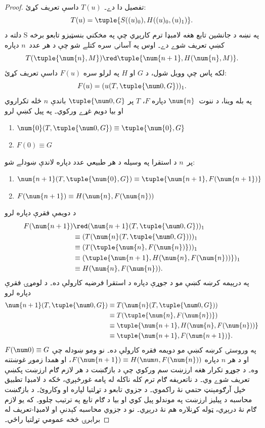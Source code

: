 \documentclass[../../../include/open-logic-section]{subfiles}
\begin{document}
\begin{proof}
تفصيل دا دے۔ $T(u)$ داسې تعريف کړئ:
\[
T(u) = \tuple{S((u)_0), H((u)_0,(u)_1)}.
\]
دلته د S په نښه د جانشين تابع هغه لامبډا
ترم کارېږي چې په مخکني بنسټيزو تابعو برخه کښې تعريف شوے دے۔
اوس په آسانۍ سره کتلے شو چې د هر عدد~$n$ دپاره
\[
T(\tuple{\num{n}, M}) \red \tuple{\num{n+1}, H(\num{n}, M)}.
\]
لکه پاس چې وويل شول، د $G$ او $H$ په لرلو سره $F(u)$ داسې
تعريف کړئ:
\[
F(u) = (u(T,\tuple{\num 0, G}))_1.
\]
په بله وينا، د ننوت~$\num{n}$ دپاره $F$، $T$ پر
$\tuple{\num 0, G}$ باندې $n$ ځله تکراروي او بيا دويم غړے
ورکوي۔ په پيل کښې لرو
\begin{enumerate}
\item $\num{0} (T, \tuple{\num 0, G}) \equiv \tuple{\num{0}, G}$
\item $F(\num{0}) \equiv G$
\end{enumerate}
پر~$n$ د استقرا په وسيله د هر طبيعي عدد دپاره لاندې ښودلے شو:
\begin{enumerate}
\item $\num{n+1}(T, \tuple{\num{0}, G}) \equiv \tuple{\num{n+1}, F(\num{n+1})}$
\item $F(\num{n+1}) \equiv H(\num{n}, F(\num{n}))$
\end{enumerate}
د دويمې فقرې دپاره لرو
\begin{align*}
F(\num{n+1}) & \red (\num{n+1}(T, \tuple{\num 0, G}))_1 \\
& \equiv (T(\num{n} (T, \tuple{\num 0, G})))_1 \\
& \equiv (T(\tuple{\num{n}, F(\num{n})}))_1 \\
& \equiv (\tuple{\num{n+1}, H(\num{n}, F(\num{n}))})_1 \\
& \equiv H(\num{n}, F(\num{n})).
\end{align*}
په درېيمه کرښه کښې مو د جوړې دپاره د استقرا فرضيه کارولې ده۔
د لومړۍ فقرې دپاره لرو
\begin{align*}
\num{n+1} (T, \tuple{\num 0, G}) &
\equiv T(\num{n} (T, \tuple{\num 0, G})) \\
& \equiv T( \tuple{\num{n}, F(\num{n})}) \\
& \equiv \tuple{\num{n+1}, H(\num{n}, F(\num{n}))} \\
& \equiv \tuple{\num{n+1}, F(\num{n+1})}.
\end{align*}
په وروستۍ کرښه کښې مو دويمه فقره کارولې ده۔ نو ومو ښودله چې
$F(\num 0) \equiv G$ او د هر $n$ دپاره $F(\num {n+1}) \equiv H(\num
n, F(\num{n}))$، او همدا زموږ غوښتنه وه۔
د جوړو تکرار هغه ارزښت سم ورکوي چې د بازګښت د هر لازم ګام ارزښت پکښې تعريف شوے وي۔ د ناتعريفه ګام ترم کله ناکله له پامه غورځېږي، ځکه د لامبډا تطبيق خپل آرګومېنټ حتمي نۀ راکموي۔ د جزوي تابعو د تړلتيا لپاره  او  وکاروئ۔ د بازګښت محاسبه د پيليز ارزښت په موندلو پيل کوي او بيا د ګام تابع په ترتيب چلوو۔ که يو لازم ګام نۀ درېږي، ټوله کړنلاره هم نۀ درېږي۔ نو د جزوي محاسبه کېدنې او لامبډا-تعريف له برابرۍ څخه عمومي تړلتيا راځي۔
\end{proof}
\end{document}
